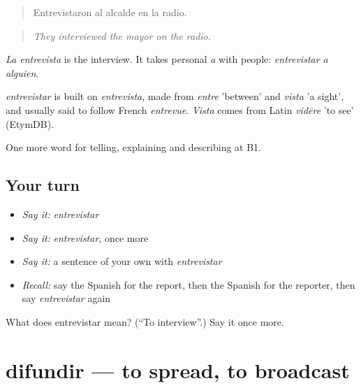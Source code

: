 \begin{quote}
Entrevistaron al alcalde en la radio.
\end{quote}

\begin{quote}
\emph{They interviewed the mayor on the radio.}
\end{quote}

\emph{La entrevista} is the interview. It takes personal \emph{a} with people: \emph{entrevistar a alguien}.

\begin{cousinweb}
\emph{entrevistar} is built on \emph{entrevista}, made from \emph{entre} 'between' and \emph{vista} 'a sight', and usually said to follow French \emph{entrevue}. \emph{Vista} comes from Latin \emph{vidēre} 'to see' (EtymDB).
\end{cousinweb}

\begin{grammarlens}[title={What you've built}]
One more word for telling, explaining and describing at B1.
\end{grammarlens}

\subsection*{Your turn}
\begin{itemize}
\raggedright
  \item \emph{Say it:} \emph{entrevistar}
  \item \emph{Say it:} \emph{entrevistar}, once more
  \item \emph{Say it:} a sentence of your own with \emph{entrevistar}
  \item \emph{Recall:} say the Spanish for the report, then the Spanish for the reporter, then say \emph{entrevistar} again
\end{itemize}

\begin{tcolorbox}[breakable,colback=teal!4,colframe=teal!35!black,title={Before you move on}]
What does entrevistar mean? (\textquotedblleft{}To interview\textquotedblright{}.) Say it once more.
\end{tcolorbox}
\section[difundir]{difundir — to spread, to broadcast}

\label{lesson:ES-C514-difundir}




